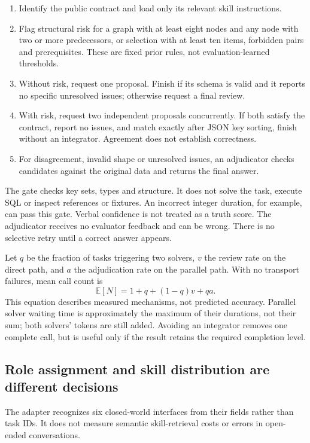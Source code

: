 \documentclass[11pt,a4paper]{article}
\begin{document}
\begin{enumerate}
\item Identify the public contract and load only its relevant skill instructions.
\item Flag structural risk for a graph with at least eight nodes and any node with
two or more predecessors, or selection with at least ten items, forbidden pairs
and prerequisites. These are fixed prior rules, not evaluation-learned thresholds.
\item Without risk, request one proposal. Finish if its schema is valid and it
reports no specific unresolved issues; otherwise request a final review.
\item With risk, request two independent proposals concurrently. If both satisfy
the contract, report no issues, and match exactly after JSON key sorting, finish
without an integrator. Agreement does not establish correctness.
\item For disagreement, invalid shape or unresolved issues, an adjudicator checks
candidates against the original data and returns the final answer.
\end{enumerate}

The gate checks key sets, types and structure. It does not solve the task, execute
SQL or inspect references or fixtures. An incorrect integer duration, for example,
can pass this gate. Verbal confidence is not treated as a truth score. The
adjudicator receives no evaluator feedback and can be wrong. There is no selective
retry until a correct answer appears.

Let $q$ be the fraction of tasks triggering two solvers, $v$ the review rate on
the direct path, and $a$ the adjudication rate on the parallel path. With no
transport failures, mean call count is
\[
\mathbb{E}[N]=1+q+(1-q)v+qa.
\]
This equation describes measured mechanisms, not predicted accuracy. Parallel
solver waiting time is approximately the maximum of their durations, not their
sum; both solvers' tokens are still added. Avoiding an integrator removes one
complete call, but is useful only if the result retains the required completion
level.

\subsection{Role assignment and skill distribution are different decisions}
The adapter recognizes six closed-world interfaces from their fields rather than
task IDs. It does not measure semantic skill-retrieval costs or errors in open-ended
conversations.
\end{document}
